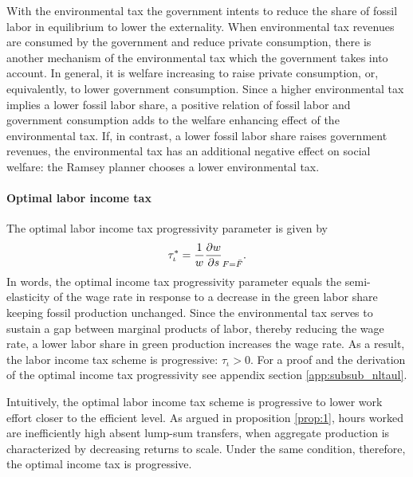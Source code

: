With the environmental tax the government intents to reduce the share of fossil labor in equilibrium to lower the externality. 
When environmental tax revenues are consumed by the government and reduce private consumption, there is another mechanism of the environmental tax which the government takes into account. In general, it is welfare increasing to raise private consumption, or, equivalently, to lower government consumption. Since a higher environmental tax implies a lower fossil labor share, a positive relation of fossil labor and government consumption adds to the welfare enhancing effect of the environmental tax. If, in contrast, a lower fossil labor share raises government revenues, the environmental tax has an additional negative effect on social welfare: the Ramsey planner chooses a lower environmental tax. 


\paragraph{Optimal labor income tax}
The optimal labor income tax progressivity parameter is given by 
\begin{align}\label{eq:nls_taulopt}
\tau_\iota^*=\frac{1}{w}\frac{\partial{w}}{\partial{s}}_{F=\bar{F}}.
\end{align}
In words, the optimal income tax progressivity parameter equals the semi-elasticity of the wage rate in response to a decrease in the green labor share keeping fossil production unchanged. 
Since the environmental tax serves to sustain a gap between marginal products of labor, thereby  reducing the wage rate, a lower labor share in green production increases the wage rate. As a result, the labor income tax scheme is progressive: $\tau_\iota>0$. For a proof and the derivation of the optimal income tax progressivity see appendix section \ref{app:subsub_nltaul}.

Intuitively, the optimal labor income tax scheme is progressive to lower work effort closer to the efficient level. As argued in proposition \ref{prop:1}, hours worked are inefficiently high absent lump-sum transfers, when aggregate production is characterized by decreasing returns to scale. Under the same condition, therefore, the optimal income tax is progressive. 


